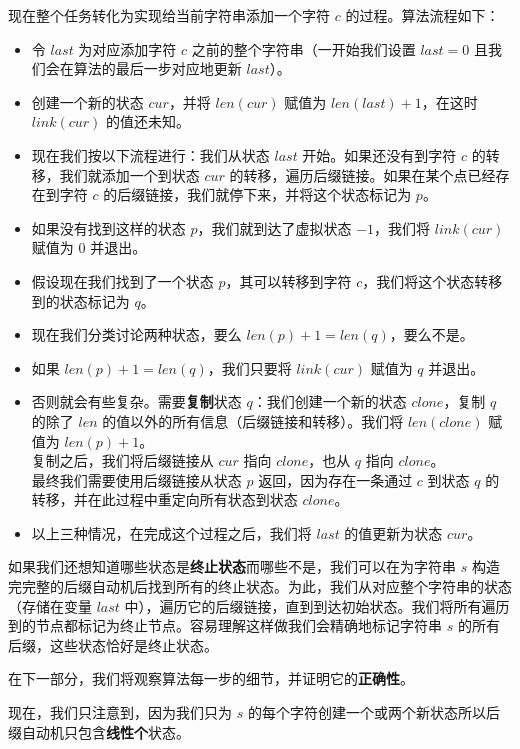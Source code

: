 现在整个任务转化为实现给当前字符串添加一个字符 \(c\)
的过程。算法流程如下：

\begin{itemize}
\item
  令 \(last\) 为对应添加字符 \(c\) 之前的整个字符串（一开始我们设置
  \(last=0\) 且我们会在算法的最后一步对应地更新 \(last\)）。
\item
  创建一个新的状态 \(cur\)，并将 \(len(cur)\) 赋值为
  \(len(last)+1\)，在这时 \(link(cur)\) 的值还未知。
\item
  现在我们按以下流程进行：我们从状态 \(last\) 开始。如果还没有到字符
  \(c\) 的转移，我们就添加一个到状态 \(cur\)
  的转移，遍历后缀链接。如果在某个点已经存在到字符 \(c\)
  的后缀链接，我们就停下来，并将这个状态标记为 \(p\)。
\item
  如果没有找到这样的状态 \(p\)，我们就到达了虚拟状态 \(-1\)，我们将
  \(link(cur)\) 赋值为 \(0\) 并退出。
\item
  假设现在我们找到了一个状态 \(p\)，其可以转移到字符
  \(c\)，我们将这个状态转移到的状态标记为 \(q\)。
\item
  现在我们分类讨论两种状态，要么 \(len(p) + 1 = len(q)\)，要么不是。
\item
  如果 \(len(p)+1=len(q)\)，我们只要将 \(link(cur)\) 赋值为 \(q\)
  并退出。
\item
  否则就会有些复杂。需要\textbf{复制}状态 \(q\)：我们创建一个新的状态
  \(clone\)，复制 \(q\) 的除了 \(len\)
  的值以外的所有信息（后缀链接和转移）。我们将 \(len(clone)\) 赋值为
  \(len(p)+1\)。\\
  复制之后，我们将后缀链接从 \(cur\) 指向 \(clone\)，也从 \(q\) 指向
  \(clone\)。\\
  最终我们需要使用后缀链接从状态 \(p\) 返回，因为存在一条通过 \(c\)
  到状态 \(q\) 的转移，并在此过程中重定向所有状态到状态 \(clone\)。
\item
  以上三种情况，在完成这个过程之后，我们将 \(last\) 的值更新为状态
  \(cur\)。
\end{itemize}

如果我们还想知道哪些状态是\textbf{终止状态}而哪些不是，我们可以在为字符串
\(s\)
构造完完整的后缀自动机后找到所有的终止状态。为此，我们从对应整个字符串的状态（存储在变量
\(last\)
中），遍历它的后缀链接，直到到达初始状态。我们将所有遍历到的节点都标记为终止节点。容易理解这样做我们会精确地标记字符串
\(s\) 的所有后缀，这些状态恰好是终止状态。

在下一部分，我们将观察算法每一步的细节，并证明它的\textbf{正确性}。

现在，我们只注意到，因为我们只为 \(s\)
的每个字符创建一个或两个新状态所以后缀自动机只包含\textbf{线性个}状态。


